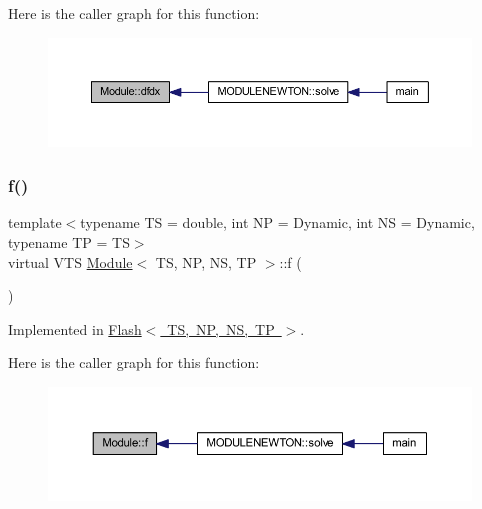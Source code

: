 Here is the caller graph for this function\+:
\nopagebreak
\begin{figure}[H]
\begin{center}
\leavevmode
\includegraphics[width=350pt]{class_module_a0762d7cbad2a73d5eff3f2f1155e8e33_icgraph}
\end{center}
\end{figure}
\mbox{\label{class_module_a2499211a4fc52bc33512761ea7fb3c62}} 
\subsubsection{\texorpdfstring{f()}{f()}}
{\footnotesize\ttfamily template$<$typename TS = double, int NP = Dynamic, int NS = Dynamic, typename TP = TS$>$ \\
virtual V\+TS \mbox{\hyperlink{class_module}{Module}}$<$ TS, NP, NS, TP $>$\+::f (\begin{DoxyParamCaption}{ }\end{DoxyParamCaption})\hspace{0.3cm}{\ttfamily [pure virtual]}}



Implemented in \mbox{\hyperlink{class_flash_ad29e755877ca96aa5b9f34a10d6cd8b2}{Flash$<$ T\+S, N\+P, N\+S, T\+P $>$}}.

Here is the caller graph for this function\+:
\nopagebreak
\begin{figure}[H]
\begin{center}
\leavevmode
\includegraphics[width=350pt]{class_module_a2499211a4fc52bc33512761ea7fb3c62_icgraph}
\end{center}
\end{figure}
\mbox{\label{class_module_a923f4a0593063f6df53e165cc1db4891}} 
